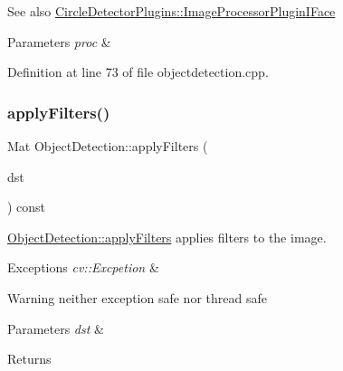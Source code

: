 \begin{DoxySeeAlso}{See also}
\hyperlink{class_circle_detector_plugins_1_1_image_processor_plugin_i_face}{Circle\+Detector\+Plugins\+::\+Image\+Processor\+Plugin\+I\+Face} 
\end{DoxySeeAlso}

\begin{DoxyParams}{Parameters}
{\em proc} & \\
\hline
\end{DoxyParams}


Definition at line 73 of file objectdetection.\+cpp.

\mbox{\label{class_image_processor_1_1_object_detection_a8879a8d088a9a7cd4aa97ac967531feb}} 
\subsubsection{\texorpdfstring{apply\+Filters()}{applyFilters()}}
{\footnotesize\ttfamily Mat Object\+Detection\+::apply\+Filters (\begin{DoxyParamCaption}\item[{cv\+::\+Mat}]{dst }\end{DoxyParamCaption}) const\hspace{0.3cm}{\ttfamily [protected]}}



\hyperlink{class_image_processor_1_1_object_detection_a8879a8d088a9a7cd4aa97ac967531feb}{Object\+Detection\+::apply\+Filters} applies filters to the image. 


\begin{DoxyExceptions}{Exceptions}
{\em cv\+::\+Excpetion} & \\
\hline
\end{DoxyExceptions}
\begin{DoxyWarning}{Warning}
neither exception safe nor thread safe 
\end{DoxyWarning}

\begin{DoxyParams}{Parameters}
{\em dst} & \\
\hline
\end{DoxyParams}
\begin{DoxyReturn}{Returns}

\end{DoxyReturn}


